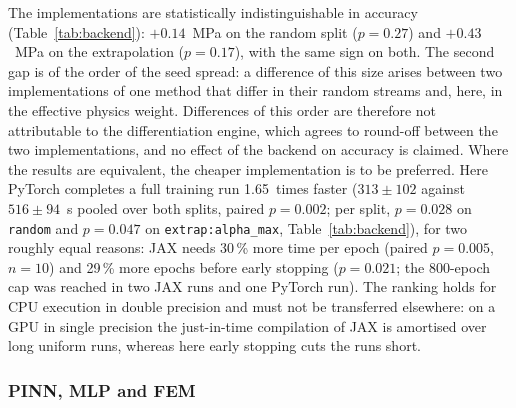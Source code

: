 The implementations are statistically indistinguishable in accuracy (Table~\ref{tab:backend}): $+0.14$~MPa on the random split ($p=0.27$) and $+0.43$~MPa on the extrapolation ($p=0.17$), with the same sign on both. The second gap is of the order of the seed spread: a difference of this size arises between two implementations of one method that differ in their random streams and, here, in the effective physics weight. %
Differences of this order are therefore not attributable to the differentiation engine, which agrees to round-off between the two implementations, and no effect of the backend on accuracy is claimed. Where the results are equivalent, the cheaper implementation is to be preferred. Here PyTorch completes a full training run 1.65~times faster ($313\pm102$ against $516\pm94$~s pooled over both splits, paired $p=0.002$; per split, $p=0.028$ on \texttt{random} and $p=0.047$ on \texttt{extrap:alpha\_max}, Table~\ref{tab:backend}), for two roughly equal reasons: JAX needs 30\,\% more time per epoch (paired $p=0.005$, $n=10$) and 29\,\% more epochs before early stopping ($p=0.021$; the 800-epoch cap was reached in two JAX runs and one PyTorch run). %
The ranking holds for CPU execution in double precision and must not be transferred elsewhere: on a GPU in single precision the just-in-time compilation of JAX is amortised over long uniform runs, whereas here early stopping cuts the runs short.

\subsubsection{PINN, MLP and FEM}
\label{sec:res_fem}

